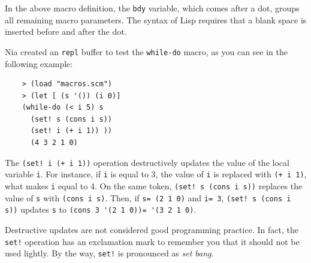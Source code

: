 \documentclass[a4paper,12pt]{book}
\newenvironment{fmpage}[1]
{\begin{lrbox}{\fmbox}\begin{minipage}{#1}}
{\end{minipage}\end{lrbox}\fbox{\usebox{\fmbox}}}
\begin{document}
In the above macro definition,
the  \verb|bdy| variable, which
comes after a dot, groups all
remaining macro parameters.
The syntax of Lisp requires that
a blank space is inserted before
and after the dot.

Nia created an \verb|repl| buffer
to test the \verb|while-do| macro,
as you can see in the following example:\\

\begin{fmpage}{0.8\linewidth}
	\begin{verbatim}
	> (load "macros.scm")
	> (let [ (s '()) (i 0)]
    (while-do (< i 5) s
      (set! s (cons i s))
      (set! i (+ i 1)) ))
      (4 3 2 1 0)
	\end{verbatim}
\end{fmpage}

\begin{fmpage}{0.8\linewidth}
	\verb||
\end{fmpage}

\vspace{0.5cm}
The \verb|(set! i (+ i 1))| operation
destructively updates the value
of the local variable \verb|i|.
For instance, if \verb|i| is
equal to 3, the value of \verb|i|
is replaced with \verb|(+ i 1)|,
what makes \verb|i| equal to 4.
On the same token, \verb|(set! s (cons i s))|
replaces the value of \verb|s| with
\verb|(cons i s)|. Then, if \verb|s= (2 1 0)|
and \verb|i= 3|,
\verb|(set! s (cons i s))| updates \verb|s|
to \verb|(cons 3 '(2 1 0))= '(3 2 1 0)|.

Destructive updates are not
considered good programming practice.
In fact, the \verb|set!| operation has
an exclamation mark to remember you
that it should not be used lightly.
By the way, \verb|set!|
is pronounced as {\em set bang}.
\end{document}
